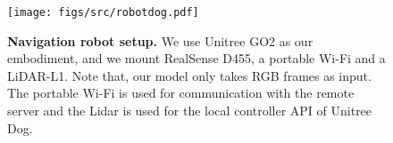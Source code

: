 \begin{figure}
\begin{center}
  \texttt{[image: figs/src/robotdog.pdf]}
\end{center}
   \caption{\textbf{Navigation robot setup.} We use Unitree GO2 as our embodiment, and we mount RealSense D455, a portable Wi-Fi and a LiDAR-L1. Note that, our model only takes RGB frames as input. The portable Wi-Fi is used for communication with the remote server and the Lidar is used for the local controller API of Unitree Dog.}
   \vspace{-10pt}
\label{fig:dog_setup}
\end{figure}